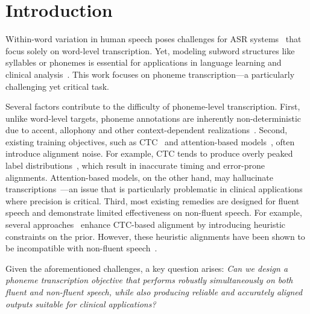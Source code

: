 \section{Introduction}

Within-word variation in human speech poses challenges for ASR systems~\cite{radford2022whisper, zhang2023google-usm, pratap2024scaling-mms, puvvada2024less-canary-nvidia, nvidia2025parakeet} that focus solely on word-level transcription. Yet, modeling subword structures like syllables or phonemes is essential for applications in language learning and clinical analysis~\cite{kheir-etal-2023-automatic-assessment-review,truong04_icall-acoustuc-phonetic,lee2016language-capt,cordella2024connected-fluency1,fontan2023automatically-fluency2,gordon1998fluency-fluency3,gordon2022clinicians-fluency4,metu2023evaluating-fluency5,ssdm, lian2024ssdm2.0, zhou2024yolostutterendtoendregionwisespeech, zhou2024stutter, zhou2024timetokensbenchmarkingendtoend}. This work focuses on phoneme transcription—a particularly challenging yet critical task.

Several factors contribute to the difficulty of phoneme-level transcription. First, unlike word-level targets, phoneme annotations are inherently non-deterministic due to accent, allophony and other context-dependent realizations~\cite{choi2025leveragingallophonyselfsupervisedspeech}. Second, existing training objectives, such as CTC~\cite{graves2006connectionist-ctc} and attention-based models~\cite{chorowski2015attention-asr}, often introduce alignment noise. For example, CTC tends to produce overly peaked label distributions~\cite{zeyer2021does-ctc-peaky}, which result in inaccurate timing and error-prone alignments. Attention-based models, on the other hand, may hallucinate transcriptions~\cite{koenecke2024careless}—an issue that is particularly problematic in clinical applications where precision is critical. Third, most existing remedies are designed for fluent speech and demonstrate limited effectiveness on non-fluent speech. For example, several approaches~\cite{tian2022bayes-ctc1, huang2024less-ctc2, yao2024cr-ctc3} enhance CTC-based alignment by introducing heuristic constraints on the prior. However, these heuristic alignments have been shown to be incompatible with non-fluent speech~\cite{lian2023unconstrained-udm, lian-anumanchipalli-2024-towards-hudm,ssdm, lian2024ssdm2.0, ye2025seamlessalignment-neurallcs}. 

Given the aforementioned challenges, a key question arises: \textit{Can we design a phoneme transcription objective that performs robustly simultaneously on both fluent and non-fluent speech, while also producing reliable and accurately aligned outputs suitable for clinical applications?} 

